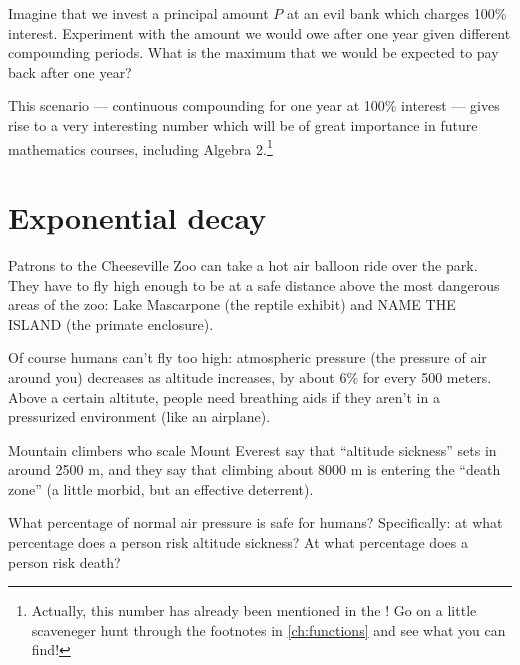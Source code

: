 \begin{boxexplore}
Imagine that we invest a principal amount $P$ at an evil bank which charges 100\% interest. Experiment with the amount we would owe after one year given different compounding periods. What is the maximum that we would be expected to pay back after one year?
\end{boxexplore}


This scenario --- continuous compounding for one year at 100\% interest --- gives rise to a very interesting number which will be of great importance in future mathematics courses, including Algebra 2.\footnote{Actually, this number has already been mentioned in the \algebranomicon! Go on a little scaveneger hunt through the footnotes in \cref{ch:functions} and see what you can find!}

\section{Exponential decay}
\label{sec:expodecay}


\begin{boxexplore}[No pressure]
Patrons to the Cheeseville Zoo can take a hot air balloon ride over the park. They have to fly high enough to be at a safe distance above the most dangerous areas of the zoo: Lake Mascarpone (the reptile exhibit) and NAME THE ISLAND (the primate enclosure).

Of course humans can't fly too high: atmospheric pressure (the pressure of air around you) decreases as altitude increases, by about 6\% for every 500 meters. Above a certain altitute, people need breathing aids if they aren't in a pressurized environment (like an airplane).

Mountain climbers who scale Mount Everest say that ``altitude sickness'' sets in around 2500 m, and they say that climbing about 8000 m is entering the ``death zone'' (a little morbid, but an effective deterrent).

What percentage of normal air pressure is safe for humans? Specifically: at what percentage does a person risk altitude sickness? At what percentage does a person risk death?

\end{boxexplore}

